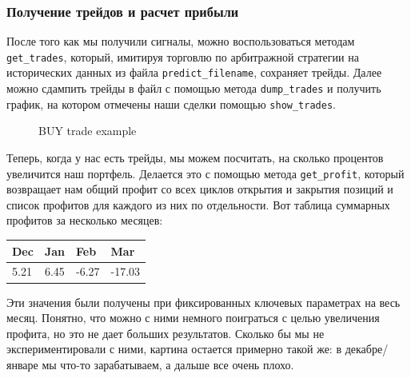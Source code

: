 \subsubsection{Получение трейдов и расчет прибыли}
После того как мы получили сигналы, можно воспользоваться методам \texttt{get\_trades}, который, имитируя торговлю по арбитражной стратегии на исторических данных из файла  \texttt{predict\_filename}, сохраняет трейды. Далее можно сдампить трейды в файл с помощью метода \texttt{dump\_trades} и получить график, на котором отмечены наши сделки  помощью \texttt{show\_trades}. 
\begin{figure}[H]
\caption{BUY trade example}
\label{fig:image}
\end{figure}


Теперь, когда у нас есть трейды, мы можем посчитать, на сколько процентов увеличится наш портфель. Делается это с помощью метода \texttt{get\_profit}, который возвращает нам общий профит со всех циклов открытия и закрытия позиций и список профитов для каждого из них по отдельности. Вот таблица суммарных профитов за несколько месяцев:

\begin{table}[h]
    \centering
    \begin{tabular}[t]{ | l | l | l | l | }
    \hline
    Dec & Jan & Feb & Mar \\ \hline
    5.21 & 6.45 & -6.27 & -17.03 \\
    \hline
    \end{tabular}
    \label{table:satellites}
\end{table}

Эти значения были получены при фиксированных ключевых параметрах на весь месяц. Понятно, что можно с ними немного поиграться с целью увеличения профита, но это не дает больших результатов. Сколько бы мы не экспериментировали с ними, картина остается примерно такой же: в декабре/январе мы что-то зарабатываем, а дальше все очень плохо.







